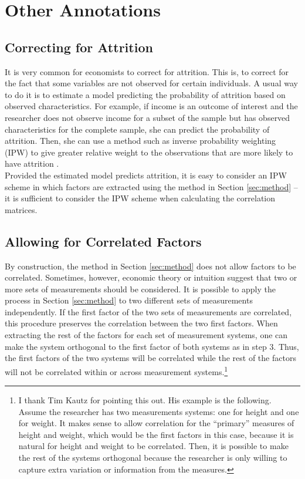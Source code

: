 \section{Other Annotations}

\subsection{Correcting for Attrition}
\noindent It is very common for economists to correct for attrition. This is, to correct for the fact that some variables are not observed for certain individuals. A usual way to do it is to estimate a model predicting the probability of attrition based on observed characteristics. For example, if income is an outcome of interest and the researcher does not observe income for a subset of the sample but has observed characteristics for the complete sample, she can predict the probability of attrition. Then, she can use a method such as inverse probability weighting (IPW) to give greater relative weight to the observations that are more likely to have attrition \citep[see][]{wooldridge2007inverse}.\\
\indent Provided the estimated model predicts attrition, it is easy to consider an IPW scheme in which factors are extracted using the method in Section \ref{sec:method} --it is sufficient to consider the IPW scheme when calculating the correlation matrices.

\subsection{Allowing for Correlated Factors}
\noindent By construction, the method in Section \ref{sec:method} does not allow factors to be correlated. Sometimes, however, economic theory or intuition suggest that two or more sets of measurements should be considered. It is possible to apply the process in Section \ref{sec:method} to two different sets of measurements independently. If the first factor of the two sets of measurements are correlated, this procedure preserves the correlation between the two first factors. When extracting the rest of the factors for each set of measurement systems, one can make the system orthogonal to the first factor of both systems as in step 3. Thus, the first factors of the two systems will be correlated while the rest of the factors will not be correlated within or across measurement systems.\footnote{I thank Tim Kautz for pointing this out. His example is the following. Assume the researcher has two measurements systems: one for height and one for weight. It makes sense to allow correlation for the ``primary'' measures of height and weight, which would be the first factors in this case, because it is natural for height and weight to be correlated. Then, it is possible to make the rest of the systems orthogonal because the researcher is only willing to capture extra variation or information from the measures.}